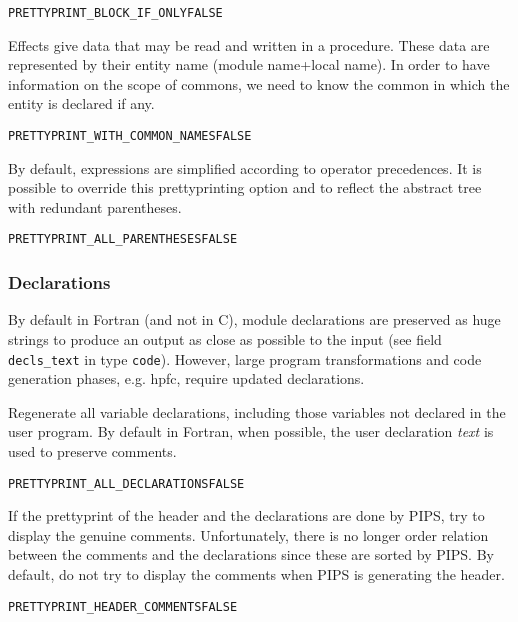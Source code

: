 \documentclass[a4paper]{report}
\newenvironment{PipsProp}{\begin{alltt}}{\end{alltt}}
\begin{document}
\begin{PipsProp}
PRETTYPRINT_BLOCK_IF_ONLY FALSE
\end{PipsProp}

Effects give data that may be read and written in a procedure. These data
are represented by their entity name (module name+local name). In order to
have information on the scope of commons, we need to know the common in
which the entity is declared if any.

\begin{PipsProp}
PRETTYPRINT_WITH_COMMON_NAMES FALSE
\end{PipsProp}

By default, expressions are simplified according to operator
precedences. It is possible to override this prettyprinting option and to
reflect the abstract tree with redundant parentheses.

\begin{PipsProp}
PRETTYPRINT_ALL_PARENTHESES FALSE
\end{PipsProp}

\subsubsection{Declarations}
\label{subsubsection-declarations}

By default in Fortran (and not in C), module declarations are preserved as
huge strings to produce an output as close as possible to the input (see
field \verb/decls_text/ in type \verb/code/). However, large program
transformations and code generation phases, e.g. hpfc, require updated
declarations.

Regenerate all variable declarations, including those variables not
declared in the user program. By default in Fortran, when possible, the
user declaration {\em text} is used to preserve comments.

\begin{PipsProp}
PRETTYPRINT_ALL_DECLARATIONS FALSE
\end{PipsProp}

If the prettyprint of the header and the declarations are done by
PIPS, try to display the genuine comments. Unfortunately, there is no
longer order relation between the comments and the declarations since
these are sorted by PIPS. By default, do not try to display the
comments when PIPS is generating the header.
\begin{PipsProp}
PRETTYPRINT_HEADER_COMMENTS FALSE
\end{PipsProp}
\end{document}
